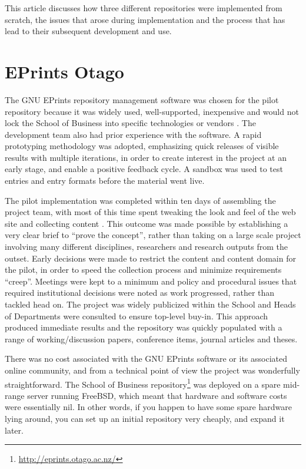 \documentclass[12pt,pdftex,a4paper,titlepage]{article}
\begin{document}
This article discusses how three different repositories were implemented from scratch, the issues that arose during implementation and the process that has lead to their subsequent development and use.


\section{EPrints Otago}

The GNU EPrints repository management software was chosen for the pilot repository because it was widely used, well-supported, inexpensive and would not lock the School of Business into specific technologies or vendors  \cite{Sale-A-2005-NZIRW}. The development team also had prior experience with the software. A rapid prototyping methodology was adopted, emphasizing quick releases of visible results with multiple iterations, in order to create interest in the project at an early stage, and enable a positive feedback cycle. A sandbox was used to test entries and entry formats before the material went live.

The pilot implementation was completed within ten days of assembling the project team, with most of this time spent tweaking the look and feel of the web site and collecting content \cite{Stan-N-2006-running}. This outcome was made possible by establishing a very clear brief to ``prove the concept'', rather than taking on a large scale project involving many different disciplines, researchers and research outputs from the outset. Early decisions were made to restrict the content and content domain for the pilot, in order to speed the collection process and minimize requirements ``creep''. Meetings were kept to a minimum and policy and procedural issues that required institutional decisions were noted as work progressed, rather than tackled head on. The project was widely publicized within the School and Heads of Departments were consulted to ensure top-level buy-in. This approach produced immediate results and the repository was quickly populated with a range of working/discussion papers, conference items, journal articles and theses.

There was no cost associated with the GNU EPrints software or its associated online community, and from a technical point of view the project was wonderfully straightforward. The School of Business repository\footnote{\url{http://eprints.otago.ac.nz/}} was deployed on a spare mid-range server running FreeBSD, which meant that hardware and software costs were essentially nil. In other words, if you happen to have some spare hardware lying around, you can set up an initial repository very cheaply, and expand it later.
\end{document}
